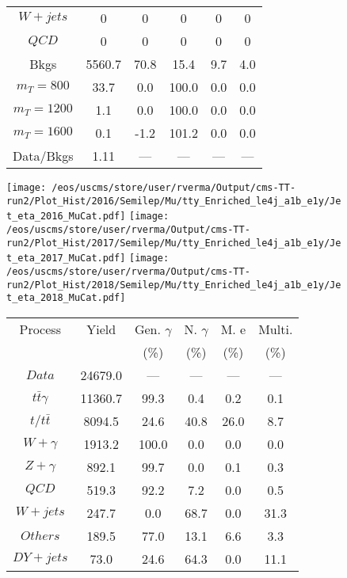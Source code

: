 \begin{figure}
\begin{minipage}[c]{0.32\textwidth}
{\begin{tabular}{cccccc}
$ W+jets $ &  0 &  0 &  0 &  0 &  0\\
$ QCD $ &  0 &  0 &  0 &  0 &  0\\
Bkgs &  5560.7 &  70.8 &  15.4 &  9.7 &  4.0\\
$ m_{T} = 800 $ &  33.7 &  0.0 &  100.0 &  0.0 &  0.0\\
$ m_{T} = 1200 $ &  1.1 &  0.0 &  100.0 &  0.0 &  0.0\\
$ m_{T} = 1600 $ &  0.1 &  -1.2 &  101.2 &  0.0 &  0.0\\
Data/Bkgs &  1.11 &  --- &  --- &  --- &  ---\\
\hline
\end{tabular}
}
\end{minipage}
\end{figure}

\begin{figure}
\centering
\texttt{[image: /eos/uscms/store/user/rverma/Output/cms-TT-run2/Plot\_Hist/2016/Semilep/Mu/tty\_Enriched\_le4j\_a1b\_e1y/Jet\_eta\_2016\_MuCat.pdf]}
\texttt{[image: /eos/uscms/store/user/rverma/Output/cms-TT-run2/Plot\_Hist/2017/Semilep/Mu/tty\_Enriched\_le4j\_a1b\_e1y/Jet\_eta\_2017\_MuCat.pdf]}
\texttt{[image: /eos/uscms/store/user/rverma/Output/cms-TT-run2/Plot\_Hist/2018/Semilep/Mu/tty\_Enriched\_le4j\_a1b\_e1y/Jet\_eta\_2018\_MuCat.pdf]}
\begin{minipage}[c]{0.32\textwidth}
\centering
\tiny{
\begin{tabular}{cccccc}
\hline
Process & Yield & Gen. $\gamma$ & N. $\gamma$ & M. e & Multi. \\
 &  & (\%) & (\%) & (\%) & (\%)  \\
\hline
                                                                      $ Data $ &  24679.0 &  --- &  --- &  --- &  ---\\
$ t\bar{t}\gamma $ &  11360.7 &  99.3 &  0.4 &  0.2 &  0.1\\
$ t/t\bar{t} $ &  8094.5 &  24.6 &  40.8 &  26.0 &  8.7\\
$ W+\gamma $ &  1913.2 &  100.0 &  0.0 &  0.0 &  0.0\\
$ Z+\gamma $ &  892.1 &  99.7 &  0.0 &  0.1 &  0.3\\
$ QCD $ &  519.3 &  92.2 &  7.2 &  0.0 &  0.5\\
$ W+jets $ &  247.7 &  0.0 &  68.7 &  0.0 &  31.3\\
$ Others $ &  189.5 &  77.0 &  13.1 &  6.6 &  3.3\\
$ DY+jets $ &  73.0 &  24.6 &  64.3 &  0.0 &  11.1\\

\end{tabular}}
\end{minipage}
\end{figure}
